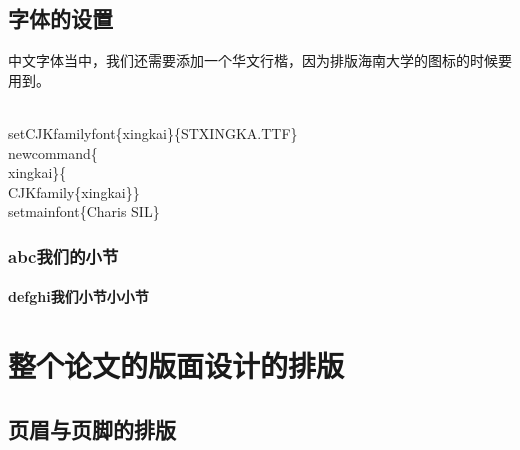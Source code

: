 \documentclass{hnuthesis}%
\begin{document}
\section{字体的设置}


中文字体当中，我们还需要添加一个华文行楷，因为排版海南大学的图标的时候要用到。
\begin{nowebtrunk}
\nwenddocs{}\plusendmoddef\nwstartdeflinemarkup{}\nwenddeflinemarkup
\\setCJKfamilyfont\{xingkai\}\{STXINGKA.TTF\}
\\newcommand\{\\xingkai\}\{\\CJKfamily\{xingkai\}\}
\\setmainfont\{Charis SIL\}
\nwendcode{}\end{nowebtrunk}

\subsection{abc我们的小节}

\subsubsection{defghi我们小节小小节}
\nwenddocs{}\chapter{整个论文的版面设计的排版}


\section{页眉与页脚的排版}
\end{document}
